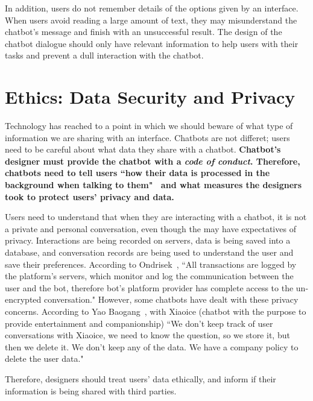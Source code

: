 \documentclass[a4paper,10pt]{article}
\begin{document}
In addition, users do not remember details of the options given by an interface. When users avoid reading a large amount of text, they may misunderstand the chatbot’s message and finish with an unsuccessful result. The design of the chatbot dialogue should only have relevant information to help users with their tasks and prevent a dull interaction with the chatbot. 
\section{Ethics: Data Security and Privacy}
Technology has reached to a point in which we should beware of what type of information we are sharing with an interface. Chatbots are not differet; users need to be careful about what data they share with a chatbot. \textbf{Chatbot's designer must provide the chatbot with a \textit{code of conduct}. Therefore, chatbots need to tell users ``how their data is processed in the background when talking to them"~\cite{PrivacyandDataSecurityofChatbots} and what measures the designers took to protect users' privacy and data.} 

Users need to understand that when they are interacting with a chatbot, it is not a private and personal conversation, even though the may have expectatives of privacy. Interactions are being recorded on servers, data is being saved into a database, and conversation records are being used to understand the user and save their preferences. According to Ondrisek~\cite{PrivacyandDataSecurityofChatbots}, ``All transactions are logged by the platform’s servers, which monitor and log the communication between the user and the bot, therefore bot's platform provider has complete access to the un-encrypted conversation."  However, some chatbots have dealt with these privacy concerns. According to Yao Baogang~\cite{ForSympatheticEar}, with Xiaoice (chatbot with the purpose to provide entertainment and companionship) ``We don’t keep track of user conversations with Xiaoice, we need to know the question, so we store it, but then we delete it. We don’t keep any of the data. We have a company policy to delete the user data."

Therefore, designers should treat users' data ethically, and inform if their information is being shared with third parties.   
\end{document}
